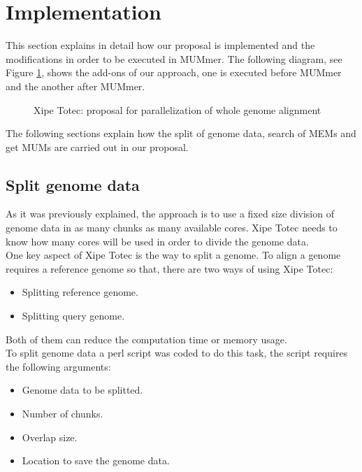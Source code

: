 \documentclass[3p,times]{elsarticle}
\begin{document}
\section{Implementation} 
\label{implementation}
This section explains in detail how our proposal is implemented and the modifications in order to be executed in MUMmer. The following diagram, see Figure \ref{xipe-totec}, shows the add-ons of our approach, one is executed before MUMmer and the another after MUMmer.
\begin{figure}[htb]  
 \begin{center} 
 \end{center}
 \caption{Xipe Totec: proposal for parallelization of whole genome alignment} 
 \label{xipe-totec} 
\end{figure}
The following sections explain how the split of genome data, search of MEMs and get MUMs are carried out in our proposal.
\subsection{Split genome data} 
As it was previously explained, the approach is to use a fixed size division of genome data in as many chunks as  many available cores. Xipe Totec needs to know how many cores will be used in order to divide the genome data.\\
One key aspect of Xipe Totec is the way to split a genome. To align a genome requires a reference genome so that, there are two ways of using Xipe Totec:
\begin{itemize}
\item Splitting reference genome.
\item Splitting query genome.
\end{itemize}
Both of them can reduce the computation time or memory usage.\\
To split genome data a perl script was coded to do this task, the script requires the following arguments:
\begin{itemize}
\item Genome data to be splitted.
\item Number of chunks.
\item Overlap size.
\item Location to save the genome data.
\end{itemize}
\end{document}
